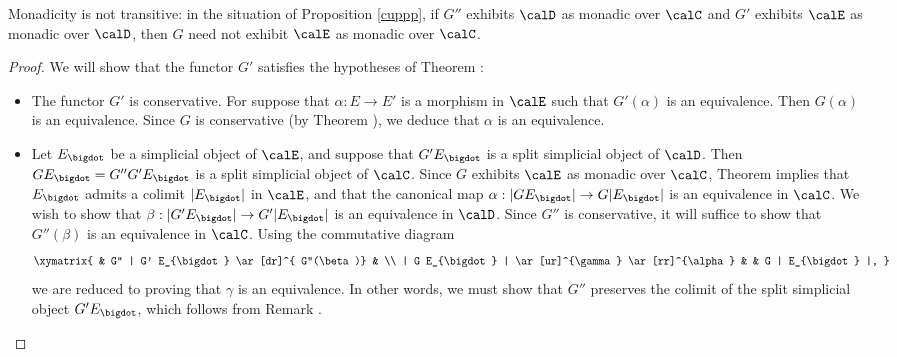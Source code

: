 \begin{warning}
Monadicity is not transitive: in the situation of Proposition \ref{cuppp}, if $G''$ exhibits $\calD$ as monadic over $\calC$ and $G'$ exhibits $\calE$ as monadic over $\calD$, then $G$ need not exhibit $\calE$ as monadic over $\calC$.
\end{warning}

\begin{proof}
We will show that the functor $G'$ satisfies the hypotheses of Theorem :
\begin{itemize}
\item[$(1)$] The functor $G'$ is conservative. For suppose that $\alpha: E \rightarrow E'$ is a morphism in $\calE$ such that $G'(\alpha)$ is an equivalence. Then $G(\alpha)$ is an equivalence. Since $G$ is conservative (by Theorem ), we deduce that $\alpha$ is an equivalence.

\item[$(2)$] Let $E_{\bigdot}$ be a simplicial object of $\calE$, and suppose that
$G' E_{\bigdot}$ is a split simplicial object of $\calD$. Then $G E_{\bigdot} = G'' G' E_{\bigdot}$ is a split simplicial object of $\calC$. Since $G$ exhibits $\calE$ as monadic over $\calC$, Theorem  implies that $E_{\bigdot}$ admits a colimit $| E_{\bigdot} |$ in $\calE$, and that the canonical map $\alpha: | G E_{\bigdot} | \rightarrow G | E_{\bigdot} |$ is an equivalence in $\calC$. We wish to show that $\beta: | G' E_{\bigdot} | \rightarrow G' | E_{\bigdot} |$ is an equivalence in $\calD$. Since
$G''$ is conservative, it will suffice to show that $G''(\beta)$ is an equivalence in $\calC$. Using the commutative diagram
$$ \xymatrix{ & G'' | G' E_{\bigdot} \ar[dr]^{ G''(\beta)} & \\
| G E_{\bigdot} | \ar[ur]^{\gamma} \ar[rr]^{\alpha} & & G | E_{\bigdot} |, }$$
we are reduced to proving that $\gamma$ is an equivalence. In other words, we must show that
$G''$ preserves the colimit of the split simplicial object $G' E_{\bigdot}$, which follows from
Remark .
\end{itemize}
\end{proof}
